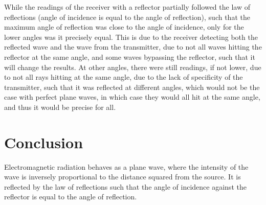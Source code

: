 \documentclass[11pt, titlepage]{article}
\begin{document}
While the readings of the receiver with a reflector partially followed the law of reflections (angle of incidence is equal to the angle of reflection), such that the maximum angle of reflection was close to the angle of incidence, only for the lower angles was it precisely equal. This is due to the receiver detecting both the reflected wave and the wave from the transmitter, due to not all waves hitting the reflector at the same angle, and some waves bypassing the reflector, such that it will change the results. At other angles, there were still readings, if not lower, due to not all rays hitting at the same angle, due to the lack of specificity of the transmitter, such that it was reflected at different angles, which would not be the case with perfect plane waves, in which case they would all hit at the same angle, and thus it would be precise for all.

\section*{Conclusion}
Electromagnetic radiation behaves as a plane wave, where the intensity of the wave is inversely proportional to the distance squared from the source. It is reflected by the law of reflections such that the angle of incidence against the reflector is equal to the angle of reflection.
\end{document}
